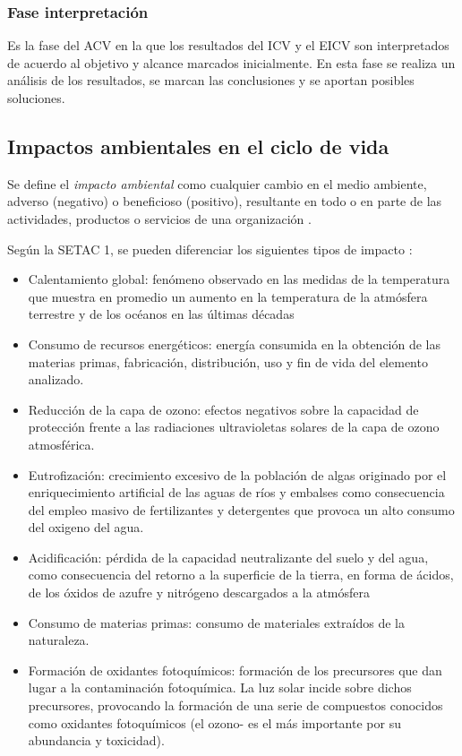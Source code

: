 \subsubsection{Fase interpretación}
Es la fase del ACV en la que los resultados del ICV y el EICV son interpretados de acuerdo al objetivo y alcance marcados inicialmente. En esta fase se realiza un análisis de los resultados, se marcan las conclusiones y se aportan posibles soluciones.

\subsection{Impactos ambientales en el ciclo de vida}\label{sec:impactosamb}

Se define el \textit{impacto ambiental} como cualquier cambio en el medio ambiente, adverso (negativo) o beneficioso (positivo), resultante en todo o en parte de las actividades, productos o servicios de una organización \cite{mlgceballos}.

Según la SETAC 1, se pueden diferenciar los siguientes tipos de impacto \cite{ihobeeco}:

\begin{itemize}
  \item Calentamiento global: fenómeno observado en las medidas de la temperatura que muestra en promedio un aumento en la temperatura de la atmósfera terrestre y de los océanos en las últimas décadas
  \item Consumo de recursos energéticos: energía consumida en la obtención de las materias primas, fabricación, distribución, uso y fin de vida del elemento analizado.
  \item Reducción de la capa de ozono: efectos negativos sobre la capacidad de protección frente a las radiaciones ultravioletas solares de la capa de ozono atmosférica.
  \item Eutrofización: crecimiento excesivo de la población de algas originado por el enriquecimiento artificial de las aguas de ríos y embalses como consecuencia del empleo masivo de fertilizantes y detergentes que provoca un alto consumo del oxigeno del agua.
  \item Acidificación: pérdida de la capacidad neutralizante del suelo y del agua, como consecuencia del retorno a la superficie de la tierra, en forma de ácidos, de los óxidos de azufre y nitrógeno descargados a la atmósfera
  \item Consumo de materias primas: consumo de materiales extraídos de la naturaleza.
  \item Formación de oxidantes fotoquímicos: formación de los precursores que dan lugar a la contaminación fotoquímica. La luz solar incide sobre dichos precursores, provocando la formación de una serie de compuestos conocidos como oxidantes fotoquímicos (el ozono- es el más importante por su abundancia y toxicidad).
\end{itemize}


